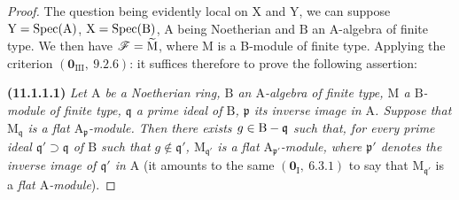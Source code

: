 \begin{proof}
The question being evidently local on $\mathrm{X}$ and $\mathrm{Y}$, we can suppose $\mathrm{Y}=\operatorname{Spec}(\mathrm{A})$, $\mathrm{X}=\operatorname{Spec}(\mathrm{B})$, $\mathrm{A}$ being Noetherian and $\mathrm{B}$ an A-algebra of finite type. We then have $\mathscr{F}=\widetilde{\mathrm{M}}$, where $\mathrm{M}$ is a B-module of finite type. Applying the criterion $(\mathbf{0}_{\mathrm{III}},~9.2.6)$: it suffices therefore to prove the following assertion:

\medskip
{}
\noindent\textbf{(11.1.1.1)}
\emph{Let $\mathrm{A}$ be a Noetherian ring, $\mathrm{B}$ an $\mathrm{A}$-algebra of finite type, $\mathrm{M}$ a $\mathrm{B}$-module of finite type, $\mathfrak{q}$ a prime ideal of $\mathrm{B}$, $\mathfrak{p}$ its inverse image in $\mathrm{A}$. Suppose that $\mathrm{M}_\mathfrak{q}$ is a flat $\mathrm{A}_\mathfrak{p}$-module. Then there exists $g\in\mathrm{B}-\mathfrak{q}$ such that, for every prime ideal $\mathfrak{q}'\supset\mathfrak{q}$ of $\mathrm{B}$ such that $g\notin\mathfrak{q}'$, $\mathrm{M}_{\mathfrak{q}'}$ is a flat $\mathrm{A}_{\mathfrak{p}'}$-module, where $\mathfrak{p}'$ denotes the inverse image of $\mathfrak{q}'$ in $\mathrm{A}$} (it amounts to the same $(\mathbf{0}_\mathrm{I},~6.3.1)$ to say that $\mathrm{M}_{\mathfrak{q}'}$ is a \emph{flat $\mathrm{A}$-module}).
\medskip


\end{proof}
